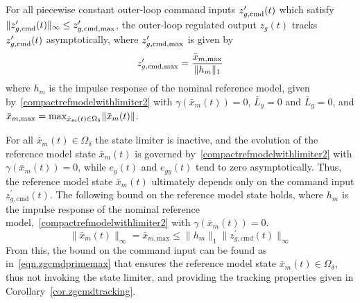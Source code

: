\begin{cor-dan}\label{cor.notForcingLimiting}
  For all piecewise constant outer-loop command inputs $z_{g,\text{\rm{cmd}}}^{\prime}(t)$ which satisfy $\|z_{g,\text{\rm{cmd}}}^{\prime}(t)\|_{\infty}\leq z_{g,\text{\rm{cmd,max}}}^{\prime}$, the outer-loop regulated output $z_{g}(t)$ tracks $z_{g,\text{\rm{cmd}}}^{\prime}(t)$ asymptotically, where $z_{g,\text{\rm{cmd,max}}}^{\prime}$ is given by
  \begin{equation}
    \label{eqn.zgcmdprimemax}
    z_{g,\text{\rm{cmd,max}}}^{\prime}=
    \frac{\bar{x}_{m,\text{\rm{max}}}}{\|h_{m}\|_{1}}
  \end{equation}
  where $h_{m}$ is the impulse response of the nominal reference model, given by\ \eqref{compactrefmodelwithlimiter2} with $\gamma(\bar{x}_{m}(t))=0$, $\bar{L}_{y}=0$ and $\bar{L}_{g}=0$, and $\bar{x}_{m,\text{\rm{max}}}=\text{\rm{max}}_{\bar{x}_{m}(t)\in\Omega_{\delta}}\|\bar{x}_{m}(t)\|$.
\end{cor-dan}

\begin{proof-dan}
  For all $\bar{x}_{m}(t)\in\Omega_{\delta}$ the state limiter is inactive, and the evolution of the reference model state $\bar{x}_{m}(t)$ is governed by\ \eqref{compactrefmodelwithlimiter2} with $\gamma(\bar{x}_{m}(t))=0$, while $e_{y}(t)$ and $e_{gy}(t)$ tend to zero asymptotically.
  Thus, the reference model state $\bar{x}_{m}(t)$ ultimately depends only on the command input $z_{g,\text{cmd}}^{\prime}(t)$.
  The following bound on the reference model state holds, where $h_{m}$ is the impulse response of the nominal reference model,\ \eqref{compactrefmodelwithlimiter2} with $\gamma(\bar{x}_{m}(t))=0$.
  \begin{equation*}
    \|\bar{x}_{m}(t)\|_{\infty}=\bar{x}_{m,\text{max}} \leq \|h_{m}\|_{1}\|z_{g,\text{cmd}}^{\prime}(t)\|_{\infty}
  \end{equation*}
  From this, the bound on the command input can be found as in\ \eqref{eqn.zgcmdprimemax} that ensures the reference model state $\bar{x}_{m}(t)\in\Omega_{\delta}$, thus not invoking the state limiter, and providing the tracking properties given in Corollary~\ref{cor.zgcmdtracking}.
\end{proof-dan}

